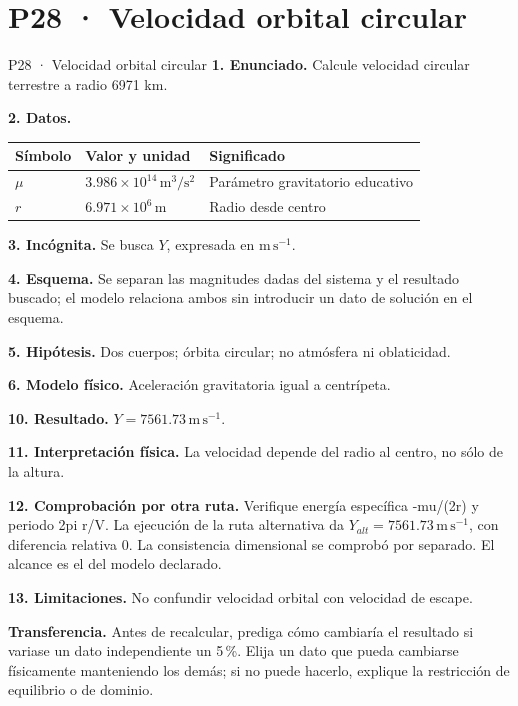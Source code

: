 \chapter*{P28 · Velocidad orbital circular}
\begin{studiumworked}{P28 · Velocidad orbital circular}
\textbf{1. Enunciado.} Calcule velocidad circular terrestre a radio 6971 km.

\textbf{2. Datos.}
\begin{longtable}{p{.16\linewidth}p{.35\linewidth}p{.38\linewidth}}\toprule Símbolo & Valor y unidad & Significado\\\midrule\endhead
$\mu$ & $3.986\times10^{14}\,\mathrm{m^3/s^2}$ & Parámetro gravitatorio educativo\\
$r$ & $6.971\times10^{6}\,\mathrm m$ & Radio desde centro\\
\bottomrule\end{longtable}
\textbf{3. Incógnita.} Se busca $Y$, expresada en $\mathrm{m\,s^{-1}}$.

\textbf{4. Esquema.} Se separan las magnitudes dadas del sistema y el resultado buscado; el modelo relaciona ambos sin introducir un dato de solución en el esquema.

\textbf{5. Hipótesis.} Dos cuerpos; órbita circular; no atmósfera ni oblaticidad.

\textbf{6. Modelo físico.} Aceleración gravitatoria igual a centrípeta.


\textbf{10. Resultado.} $Y=7561.73\,\mathrm{m\,s^{-1}}$.

\textbf{11. Interpretación física.} La velocidad depende del radio al centro, no sólo de la altura.

\textbf{12. Comprobación por otra ruta.} Verifique energía específica -mu/(2r) y periodo 2pi r/V. La ejecución de la ruta alternativa da $Y_{alt}=7561.73\,\mathrm{m\,s^{-1}}$, con diferencia relativa $0$. La consistencia dimensional se comprobó por separado. El alcance es el del modelo declarado.

\textbf{13. Limitaciones.} No confundir velocidad orbital con velocidad de escape.

\textbf{Transferencia.} Antes de recalcular, prediga cómo cambiaría el resultado si variase un dato independiente un 5\,\%. Elija un dato que pueda cambiarse físicamente manteniendo los demás; si no puede hacerlo, explique la restricción de equilibrio o de dominio.\par
\end{studiumworked}
